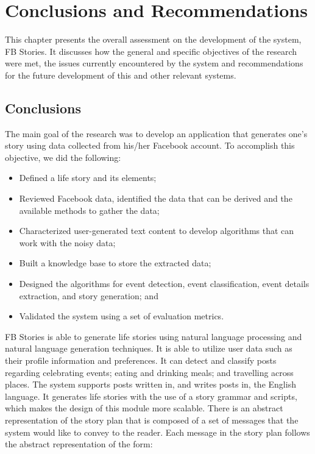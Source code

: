 \chapter{Conclusions and Recommendations}
\label{sec:conclusionsandrecommendations} 
This chapter presents the overall assessment on the development of the system, FB Stories. It discusses how the general and specific objectives of the research were met, the issues currently encountered by the system and recommendations for the future development of this and other relevant systems.

\section{Conclusions}
The main goal of the research was to develop an application that generates one’s story using data collected from his/her Facebook account. To accomplish this objective, we did the following: 
\begin{itemize}
	\item Defined a life story and its elements;
	\item Reviewed Facebook data, identified the data that can be derived and the available methods to gather the data;
	\item Characterized user-generated text content to develop algorithms that can work with the noisy data;
	\item Built a knowledge base to store the extracted data;
	\item Designed the algorithms for event detection, event classification, event details extraction, and story generation; and 
	\item Validated the system using a set of evaluation metrics.
\end{itemize}

FB Stories is able to generate life stories using natural language processing and natural language generation techniques. It is able to utilize user data such as their profile information and preferences.  It can detect and classify posts regarding celebrating events; eating and drinking meals; and travelling across places. The system supports posts written in, and writes posts in, the English language. It generates life stories with the use of a story grammar and scripts, which makes the design of this module more scalable. There is an abstract representation of the story plan that is composed of a set of messages that the system would like to convey to the reader. Each message in the story plan follows the abstract representation of the form:

